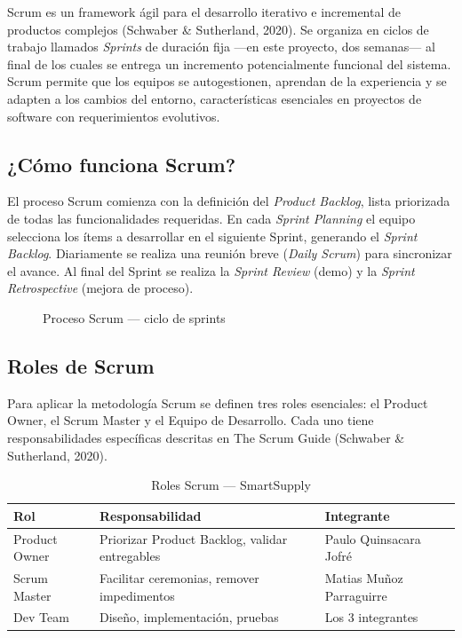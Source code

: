 \documentclass[12pt, a4paper]{report}
\begin{document}
Scrum es un framework ágil para el desarrollo iterativo e incremental de productos
complejos (Schwaber \& Sutherland, 2020). Se organiza en ciclos de trabajo llamados
\textit{Sprints} de duración fija —en este proyecto, dos semanas— al final de los cuales se
entrega un incremento potencialmente funcional del sistema. Scrum permite que los
equipos se autogestionen, aprendan de la experiencia y se adapten a los cambios del
entorno, características esenciales en proyectos de software con requerimientos evolutivos.

\subsection{¿Cómo funciona Scrum?}

El proceso Scrum comienza con la definición del \textit{Product Backlog}, lista priorizada de
todas las funcionalidades requeridas. En cada \textit{Sprint Planning} el equipo selecciona
los ítems a desarrollar en el siguiente Sprint, generando el \textit{Sprint Backlog}. Diariamente
se realiza una reunión breve (\textit{Daily Scrum}) para sincronizar el avance. Al final del Sprint
se realiza la \textit{Sprint Review} (demo) y la \textit{Sprint Retrospective} (mejora de proceso).

\begin{figure}[H]
  \centering
  \caption{Proceso Scrum — ciclo de sprints}
  \label{fig:scrum}
\end{figure}

\subsection{Roles de Scrum}

Para aplicar la metodología Scrum se definen tres roles esenciales: el Product Owner,
el Scrum Master y el Equipo de Desarrollo. Cada uno tiene responsabilidades específicas
descritas en The Scrum Guide (Schwaber \& Sutherland, 2020).

\begin{table}[H]
  \centering
  \caption{Roles Scrum — SmartSupply}
  \label{tab:roles_scrum}
  \begin{tabular}{|l|l|l|}
    \hline
    \textbf{Rol} & \textbf{Responsabilidad} & \textbf{Integrante} \\
    \hline
    Product Owner & Priorizar Product Backlog, validar entregables & Paulo Quinsacara Jofré \\
    Scrum Master  & Facilitar ceremonias, remover impedimentos     & Matias Muñoz Parraguirre \\
    Dev Team      & Diseño, implementación, pruebas                & Los 3 integrantes \\
    \hline
  \end{tabular}
\end{table}
\end{document}
